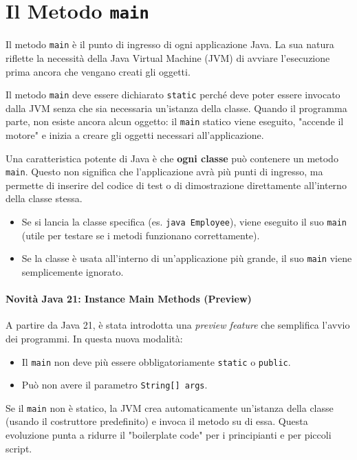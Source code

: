 \section{Il Metodo \texttt{main}}

Il metodo \texttt{main} è il punto di ingresso di ogni applicazione Java. La sua natura riflette la necessità della Java Virtual Machine (JVM) di avviare l'esecuzione prima ancora che vengano creati gli oggetti.

Il metodo \texttt{main} deve essere dichiarato \texttt{static} perché deve poter essere invocato dalla JVM senza che sia necessaria un'istanza della classe. Quando il programma parte, non esiste ancora alcun oggetto: il \texttt{main} statico viene eseguito, "accende il motore" e inizia a creare gli oggetti necessari all'applicazione.


Una caratteristica potente di Java è che \textbf{ogni classe} può contenere un metodo \texttt{main}. Questo non significa che l'applicazione avrà più punti di ingresso, ma permette di inserire del codice di test o di dimostrazione direttamente all'interno della classe stessa.
\begin{itemize}
    \item Se si lancia la classe specifica (es. \texttt{java Employee}), viene eseguito il suo \texttt{main} (utile per testare se i metodi funzionano correttamente).
    \item Se la classe è usata all'interno di un'applicazione più grande, il suo \texttt{main} viene semplicemente ignorato.
\end{itemize}

\paragraph{Novità Java 21: Instance Main Methods (Preview)}
A partire da Java 21, è stata introdotta una \textit{preview feature} che semplifica l'avvio dei programmi. In questa nuova modalità:
\begin{itemize}
    \item Il \texttt{main} non deve più essere obbligatoriamente \texttt{static} o \texttt{public}.
    \item Può non avere il parametro \texttt{String[] args}.
\end{itemize}
Se il \texttt{main} non è statico, la JVM crea automaticamente un'istanza della classe (usando il costruttore predefinito) e invoca il metodo su di essa. Questa evoluzione punta a ridurre il "boilerplate code" per i principianti e per piccoli script.



